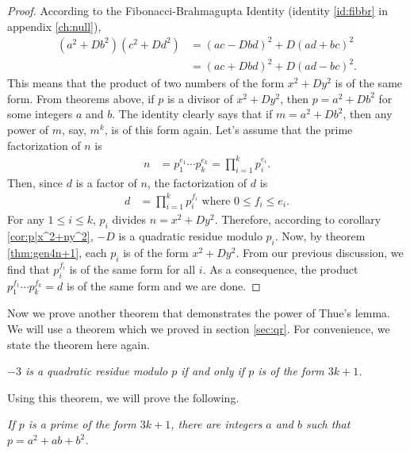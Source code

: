 \documentclass{subfile}
\begin{document}
	\begin{proof}
		According to the Fibonacci-Brahmagupta Identity (identity \eqref{id:fibbr} in appendix \eqref{ch:null}),
			\begin{align*}
				(a^2+Db^2)(c^2+Dd^2)& =(ac-Dbd)^2+D(ad+bc)^2\\
				& =(ac+Dbd)^2+D(ad-bc)^2.
			\end{align*}
		This means that the product of two numbers of the form $x^2+Dy^2$ is of the same form. From theorems above, if $p$ is a divisor of $x^2+Dy^2$, then $p=a^2+Db^2$ for some integers $a$ and $b$. The identity clearly says that if $m=a^2+Db^2$, then any power of $m$, say, $m^k$, is of this form again. Let's assume that the prime factorization of $n$ is
			\begin{align*}
				n & = p_1^{e_1}\cdots p_k^{e_k} = \prod_{i=1}^{k}p_i^{e_i}.
			\end{align*}
		Then, since $d$ is a factor of $n$, the factorization of $d$ is
			\begin{align*}
				d & = \prod_{i=1}^{k}p_i^{f_i}\text{ where }0\leq f_i\leq e_i.
			\end{align*}
		For any $1\leq i\leq k$, $p_i$ divides $n=x^2+Dy^2$. Therefore, according to corollary \eqref{cor:p|x^2+ny^2}, $-D$ is a quadratic residue modulo $p_i$. Now, by theorem \eqref{thm:gen4n+1}, each $p_i$ is of the form $x^2+Dy^2$. From our previous discussion, we find that $p_i^{f_i}$ is of the same form for all $i$. As a consequence, the product $p_1^{f_1}\cdots p_k^{f_k}=d$ is of the same form and we are done.
	\end{proof}
	Now we prove another theorem that demonstrates the power of Thue's lemma. We will use a theorem which we proved in section \eqref{sec:qr}. For convenience, we state the theorem here again.
		\begin{theorem}\slshape
			$-3$ is a quadratic residue modulo $p$ if and only if $p$ is of the form $3k+1$.
		\end{theorem}
	Using this theorem, we will prove the following.
		\begin{theorem}\slshape
			If $p$ is a prime of the form $3k+1$, there are integers $a$ and $b$ such that $p=a^2+ab+b^2$.
		\end{theorem}
	
\end{document}
